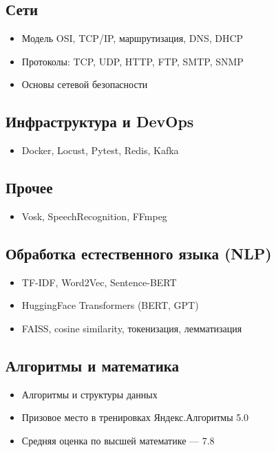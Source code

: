 \documentclass[a4paper,11pt]{article}
\begin{document}
	\subsection*{Сети}
	\begin{itemize}
		\item Модель OSI, TCP/IP, маршрутизация, DNS, DHCP
		\item Протоколы: TCP, UDP, HTTP, FTP, SMTP, SNMP
		\item Основы сетевой безопасности
	\end{itemize}
	
	\subsection*{Инфраструктура и DevOps}
	\begin{itemize}
		\item Docker, Locust, Pytest, Redis, Kafka
	\end{itemize}
	
	\subsection*{Прочее}
	\begin{itemize}
		\item Vosk, SpeechRecognition, FFmpeg
	\end{itemize}
	
	\subsection*{Обработка естественного языка (NLP)}
	\begin{itemize}
		\item TF-IDF, Word2Vec, Sentence-BERT
		\item HuggingFace Transformers (BERT, GPT)
		\item FAISS, cosine similarity, токенизация, лемматизация
	\end{itemize}
	
	\subsection*{Алгоритмы и математика}
	\begin{itemize}
		\item Алгоритмы и структуры данных
		\item Призовое место в тренировках Яндекс.Алгоритмы 5.0
		\item Средняя оценка по высшей математике — 7.8
	\end{itemize}
	
\end{document}
